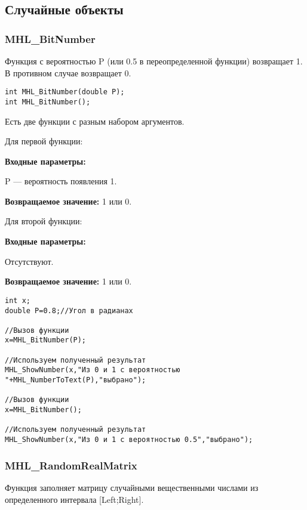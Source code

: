 \documentclass[a4paper,12pt]{article}
\begin{document}
\subsection{Случайные объекты}

\subsubsection{MHL\_BitNumber}\label{MHL_BitNumber}

Функция с вероятностью P (или 0.5 в переопределенной функции) возвращает 1. В противном случае возвращает 0.


\begin{lstlisting}[label=code_syntax_MHL_BitNumber,caption=Синтаксис]
int MHL_BitNumber(double P);
int MHL_BitNumber();
\end{lstlisting}

Есть две функции с разным набором аргументов.

Для первой функции:

\textbf{Входные параметры:}

 P --- вероятность появления 1.

\textbf{Возвращаемое значение:}
1 или 0.

Для второй функции:

\textbf{Входные параметры:}

 Отсутствуют.

\textbf{Возвращаемое значение:}
1 или 0.


\begin{lstlisting}[label=code_use_MHL_BitNumber,caption=Пример использования]
int x;
double P=0.8;//Угол в радианах

//Вызов функции
x=MHL_BitNumber(P);

//Используем полученный результат
MHL_ShowNumber(x,"Из 0 и 1 с вероятностью "+MHL_NumberToText(P),"выбрано");

//Вызов функции
x=MHL_BitNumber();

//Используем полученный результат
MHL_ShowNumber(x,"Из 0 и 1 с вероятностью 0.5","выбрано");
\end{lstlisting}

\subsubsection{MHL\_RandomRealMatrix}\label{MHL_RandomRealMatrix}

Функция заполняет матрицу случайными вещественными числами из определенного интервала [Left;Right].
\end{document}

